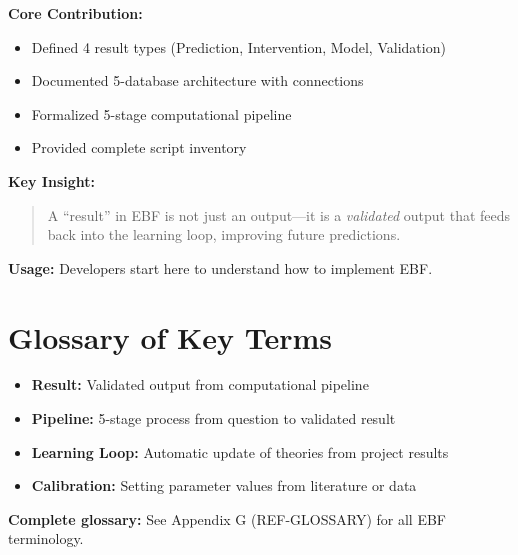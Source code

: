 \begin{tcolorbox}[colback=blue!5!white, colframe=blue!75!black,
    title=\textbf{Appendix UNMAPPED_DP Summary}]

\textbf{Core Contribution:}
\begin{itemize}[nosep]
    \item Defined 4 result types (Prediction, Intervention, Model, Validation)
    \item Documented 5-database architecture with connections
    \item Formalized 5-stage computational pipeline
    \item Provided complete script inventory
\end{itemize}

\textbf{Key Insight:}
\begin{quote}
A ``result'' in EBF is not just an output---it is a \textit{validated} output
that feeds back into the learning loop, improving future predictions.
\end{quote}

\textbf{Usage:} Developers start here to understand how to implement EBF.

\end{tcolorbox}

\section{Glossary of Key Terms}
\label{sec:dp-glossary}

\begin{itemize}[nosep]
    \item \textbf{Result:} Validated output from computational pipeline
    \item \textbf{Pipeline:} 5-stage process from question to validated result
    \item \textbf{Learning Loop:} Automatic update of theories from project results
    \item \textbf{Calibration:} Setting parameter values from literature or data
\end{itemize}

\medskip
\textbf{Complete glossary:} See Appendix G (REF-GLOSSARY) for all EBF terminology.

